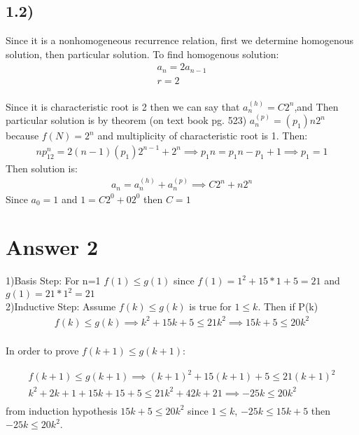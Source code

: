 \documentclass[12pt]{article}
\begin{document}
\subsection*{1.2)}
Since it is a nonhomogeneous recurrence relation, first we determine homogenous solution, then particular solution. To find homogenous solution:
\begin{equation} 
\begin{split} 
    a_n=2a_{n-1} \\
    r=2
\end{split}
\end{equation} \\
Since it is characteristic root is 2 then we can say that $a_n^{(h)} = C2^n$,and Then particular solution is by theorem (on text book pg. 523) $a^{(p)}_n=(p_1)n2^n$ because $f(N)=2^n$ and multiplicity of characteristic root is 1. Then:
\begin{equation} 
\begin{split} 
    np_12^n=2(n-1)(p_1)2^{n-1}+2^n \implies p_1n = p_1n-p_1+1 \implies p_1=1
\end{split}
\end{equation} 
Then solution is:
\begin{equation} 
\begin{split} 
    a_n = a_n^{(h)}+a_n^{(p)} \implies C2^n+n2^n
\end{split}
\end{equation} 
Since $a_0 = 1$ and $1 = C2^0+02^0$ then $C=1$
\section*{Answer 2}
1)Basis Step: For n=1 $f(1)\leq g(1)$ since $f(1) = 1^2+15*1+5 = 21$ and $g(1) = 21*1^2 = 21$ \\
2)Inductive Step: Assume $f(k) \leq g(k)$ is true for $1\leq k$. Then if P(k)
\begin{equation} 
\begin{split} 
    f(k) \leq g(k) \implies k^2+15k+5 \leq  21k^2 \implies 15k+5 \leq 20k^2
\end{split}
\end{equation}\\
In order to prove $f(k+1) \leq g(k+1)$:
    
\begin{equation} 
\begin{split} 
    f(k+1) \leq g(k+1) \implies (k+1)^2+15(k+1)+5 \leq  21(k+1)^2 \\
    k^2+2k+1+15k+15+5 \leq 21k^2 +42k+21 \implies -25k \leq 20k^2 \\
\end{split}
\end{equation} 
from induction hypothesis $15k+5 \leq 20k^2$  since $1\leq k$, $-25k\leq15k+5$ then $-25k \leq 20k^2$.
\end{document}
